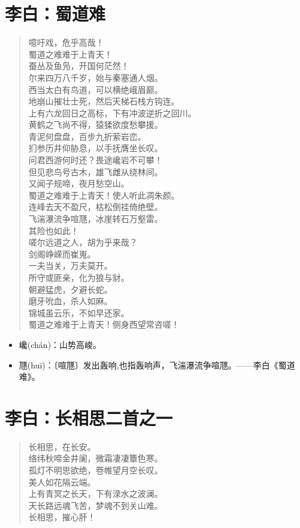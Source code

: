 \documentclass[12pt,oneside]{book}
\newenvironment{shici}{
\begin{verse}
\centering\large\hspace{12pt}}
{\end{verse}}
\begin{document}
\chapter{李白：蜀道难}
\begin{shici}
噫吁戏，危乎高哉！\\
蜀道之难难于上青天！\\
蚕丛及鱼凫，开国何茫然！\\
尔来四万八千岁，始与秦塞通人烟。\\
西当太白有鸟道，可以横绝峨眉巅。\\
地崩山摧壮士死，然后天梯石栈方钩连。\\
上有六龙回日之高标，下有冲波逆折之回川。\\
黄鹤之飞尚不得，猿猱欲度愁攀援。\\
青泥何盘盘，百步九折萦岩峦。\\
扪参历井仰胁息，以手抚膺坐长叹。\\
问君西游何时还？畏途巉岩不可攀！\\
但见悲鸟号古木，雄飞雌从绕林间。\\
又闻子规啼，夜月愁空山。\\
蜀道之难难于上青天！使人听此凋朱颜。\\
连峰去天不盈尺，枯松倒挂倚绝壁。\\
飞湍瀑流争喧豗，冰崖转石万壑雷。\\
其险也如此！\\
嗟尔远道之人，胡为乎来哉？\\
剑阁峥嵘而崔嵬。\\
一夫当关，万夫莫开。\\
所守或匪亲，化为狼与豺。\\
朝避猛虎，夕避长蛇。\\
磨牙吮血，杀人如麻。\\
锦城虽云乐，不如早还家。\\
蜀道之难难于上青天！侧身西望常咨嗟！
\end{shici}

\begin{itemize}
\item 巉(chán)：山势高峻。
\item 豗(huī)：〔喧豗〕发出轰响,也指轰响声，飞湍瀑流争喧豗。——李白《蜀道难》。
\end{itemize}


\chapter{李白：长相思二首之一}
\begin{shici}
长相思，在长安。\\
络纬秋啼金井阑，微霜凄凄簟色寒。\\
孤灯不明思欲绝，卷帷望月空长叹。\\
美人如花隔云端。\\
上有青冥之长天，下有渌水之波澜。\\
天长路远魂飞苦，梦魂不到关山难。\\
长相思，摧心肝！
\end{shici}
\end{document}
